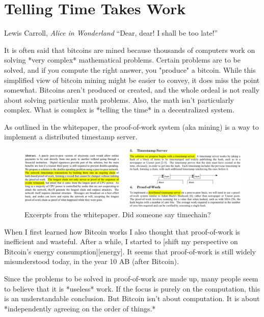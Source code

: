 \chapter{ Telling Time Takes Work}
\label{les:17}

\begin{chapquote}{Lewis Carroll, \textit{Alice in Wonderland}}
``Dear, dear! I shall be too late!''
\end{chapquote}

It is often said that bitcoins are mined because thousands of computers
work on solving *very complex* mathematical problems. Certain problems
are to be solved, and if you compute the right answer, you "produce" a
bitcoin. While this simplified view of bitcoin mining might be easier to
convey, it does miss the point somewhat. Bitcoins aren't produced or
created, and the whole ordeal is not really about solving particular
math problems. Also, the math isn't particularly complex. What is
complex is *telling the time* in a decentralized system.

As outlined in the whitepaper, the proof-of-work system (aka mining) is
a way to implement a distributed timestamp server.

\begin{figure}
  \includegraphics{assets/images/bitcoin-whitepaper-timestamp-wide.png}
  \caption{Excerpts from the whitepaper. Did someone say timechain?}
  \label{fig:bitcoin-whitepaper-timestamp-wide}
\end{figure}

When I first learned how Bitcoin works I also thought that proof-of-work
is inefficient and wasteful. After a while, I started to [shift my
perspective on Bitcoin's energy consumption][energy]. It seems that
proof-of-work is still widely misunderstood today, in the year 10 AB
(after Bitcoin).

Since the problems to be solved in proof-of-work are made up, many
people seem to believe that it is *useless* work. If the focus is purely
on the computation, this is an understandable conclusion. But Bitcoin
isn't about computation. It is about *independently agreeing on the
order of things.*

